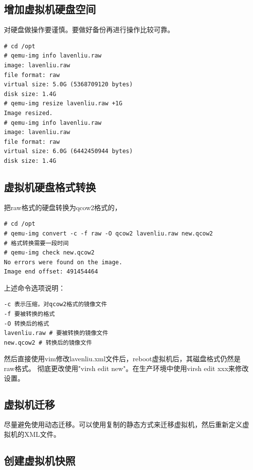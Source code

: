 \subsection{增加虚拟机硬盘空间}
\label{sec:scaleVmDisk}

对硬盘做操作要谨慎。要做好备份再进行操作比较可靠。

\begin{verbatim}
# cd /opt
# qemu-img info lavenliu.raw 
image: lavenliu.raw
file format: raw
virtual size: 5.0G (5368709120 bytes)
disk size: 1.4G
# qemu-img resize lavenliu.raw +1G
Image resized.
# qemu-img info lavenliu.raw 
image: lavenliu.raw
file format: raw
virtual size: 6.0G (6442450944 bytes)
disk size: 1.4G
\end{verbatim}

\subsection{虚拟机硬盘格式转换}
\label{sec:convertVmDisk}

把raw格式的硬盘转换为qcow2格式的，

\begin{verbatim}
# cd /opt
# qemu-img convert -c -f raw -O qcow2 lavenliu.raw new.qcow2
# 格式转换需要一段时间
# qemu-img check new.qcow2
No errors were found on the image.
Image end offset: 491454464
\end{verbatim}

上述命令选项说明：

\begin{verbatim}
-c 表示压缩，对qcow2格式的镜像文件
-f 要被转换的格式
-O 转换后的格式
lavenliu.raw # 要被转换的镜像文件
new.qcow2 # 转换后的镜像文件
\end{verbatim}

然后直接使用vim修改lavenliu.xml文件后，reboot虚拟机后，其磁盘格式仍然是raw格式。
彻底更改使用"virsh edit new"。在生产环境中使用virsh edit xxx来修改设置。

\subsection{虚拟机迁移}
\label{sec:moveVM}

尽量避免使用动态迁移。可以使用复制的静态方式来迁移虚拟机，然后重新定义虚拟机的XML文件。

\subsection{创建虚拟机快照}
\label{sec:createSnapShot}

